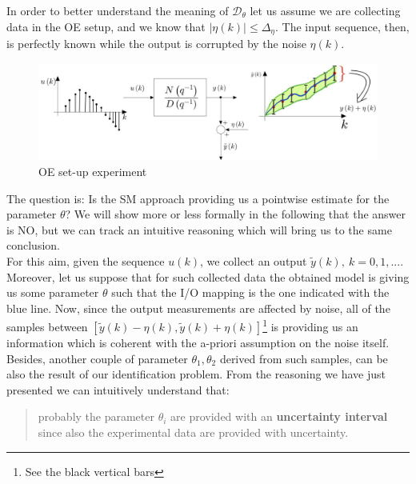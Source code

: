 \noindent
In order to better understand the meaning of $\mathcal{D}_\theta$ let us assume we are collecting data in the OE setup, and we know that $\vert \eta(k) \vert \le \Delta_\eta$. The input sequence, then, is perfectly known while the output is corrupted by the noise $\eta(k)$.

\begin{figure}[h]
    \centering
    \includegraphics[scale=0.32]{img/oe_example.jpeg}
    \caption{OE set-up experiment}
\end{figure}

\noindent
The question is: \textsf{Is the SM approach providing us a pointwise estimate for the parameter $\theta$?} We will show more or less formally in the following that the answer is NO, but we can track an intuitive reasoning which will bring us to the same conclusion. \\
For this aim, given the sequence $u(k)$, we collect an output $\tilde{y}(k), \ k=0, 1, ...$. Moreover, let us suppose that for such collected data the obtained model is giving us some parameter $\theta$ such that the I/O mapping is the one indicated with the {\color{blue} blue} line. Now, since the output measurements are affected by noise, all of the samples between $[\tilde{y}(k)-\eta(k), \tilde{y}(k)+\eta(k)]$\footnote{
    See the black vertical bars
} is providing us an information which is coherent with the a-priori assumption on the noise itself. Besides, another couple of parameter $\theta_1, \theta_2$ derived from such samples, can be also the result of our identification problem. From the reasoning we have just presented we can intuitively understand that:
\begin{quotation} 
    \noindent
    \textsf{probably the parameter $\theta_i$ are provided with an \textbf{uncertainty interval} since also the experimental data are provided with uncertainty.}
\end{quotation}

